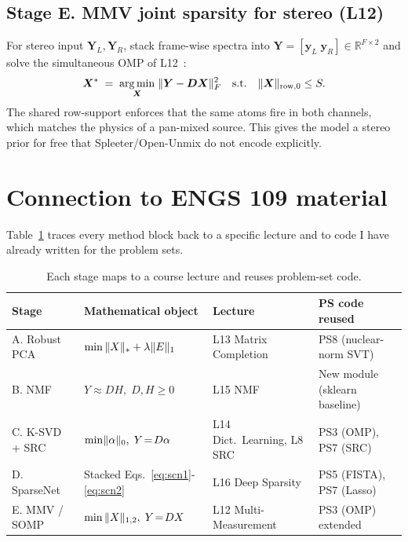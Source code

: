 \documentclass[11pt]{article}
\DeclarePairedDelimiter{\norm}{\lVert}{\rVert}
\DeclareMathOperator*{\argmin}{arg\,min}
\newcommand{\R}{\mathbb{R}}
\newcommand{\D}{\bm{D}}
\newcommand{\yb}{\bm{y}}
\begin{document}
\subsection*{Stage E. MMV joint sparsity for stereo (L12)}
For stereo input $\bm{Y}_L,\bm{Y}_R$, stack frame-wise spectra into
$\bm{Y}=[\yb_L\;\yb_R]\in\R^{F\times 2}$ and solve the simultaneous OMP
of L12~\cite{tropp2006somp}:
\[
\bm{X}^* \;=\; \argmin_{\bm{X}}\; \norm{\bm{Y} - \D\bm{X}}_F^2
\quad\text{s.t.}\quad \norm{\bm{X}}_{\mathrm{row},0} \le S.
\]
The shared row-support enforces that the same atoms fire in both channels,
which matches the physics of a pan-mixed source.  This gives the model a
stereo prior for free that Spleeter/Open-Unmix do not encode explicitly.

\section{Connection to ENGS 109 material}
Table~\ref{tab:map} traces every method block back to a specific lecture and
to code I have already written for the problem sets.

\begin{table}[h]
\small
\centering
\caption{Each stage maps to a course lecture and reuses problem-set code.}
\label{tab:map}
\begin{tabular}{@{}llll@{}}
\toprule
\textbf{Stage} & \textbf{Mathematical object} & \textbf{Lecture} &
\textbf{PS code reused} \\
\midrule
A. Robust PCA      & $\min\,\norm{X}_* + \lambda\norm{E}_1$
                   & L13 Matrix Completion
                   & PS8 (nuclear-norm SVT) \\
B. NMF             & $Y\!\approx\!DH,\;D,H\!\ge\!0$
                   & L15 NMF
                   & New module (sklearn baseline) \\
C. K-SVD + SRC     & $\min\norm{\alpha}_0,\;Y\!=\!D\alpha$
                   & L14 Dict.\ Learning, L8 SRC
                   & PS3 (OMP), PS7 (SRC) \\
D. SparseNet       & Stacked Eqs.~\eqref{eq:scn1}-\eqref{eq:scn2}
                   & L16 Deep Sparsity
                   & PS5 (FISTA), PS7 (Lasso) \\
E. MMV / SOMP      & $\min\,\norm{X}_{1,2},\;Y\!=\!DX$
                   & L12 Multi-Measurement
                   & PS3 (OMP) extended \\
\bottomrule
\end{tabular}
\end{table}
\end{document}
